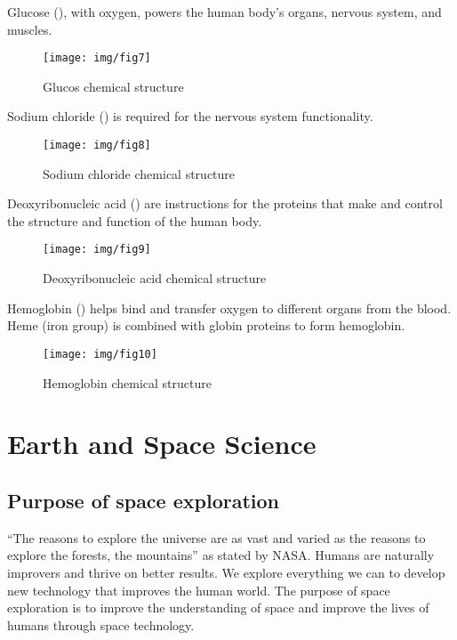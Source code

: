 \documentclass{article}
\begin{document}
Glucose (), with oxygen, powers the human body’s organs, nervous system, and muscles.
 
\begin{figure}[htbp]
    \center
    \texttt{[image: img/fig7]}
    \caption{Glucos chemical structure}
\end{figure}
 
\newpage
 
Sodium chloride () is required for the nervous system functionality. 
 
\begin{figure}[htbp]
    \center
    \texttt{[image: img/fig8]}
    \caption{Sodium chloride chemical structure}
\end{figure}
 
Deoxyribonucleic acid () are instructions for the proteins that make and control the structure and function of the human body.
 
\begin{figure}[htbp]
    \center
    \texttt{[image: img/fig9]}
    \caption{Deoxyribonucleic acid chemical structure}
\end{figure}
 
Hemoglobin () helps bind and transfer oxygen to different organs from the blood. Heme (iron group) is combined with globin proteins to form hemoglobin. 
 
\begin{figure}[htbp]
    \center
    \texttt{[image: img/fig10]}
    \caption{Hemoglobin chemical structure}
\end{figure}
 
\newpage
 
\section{Earth and Space Science}
 
\subsection{Purpose of space exploration}
“The reasons to explore the universe are as vast and varied as the reasons to explore the forests, the mountains” as stated by NASA. Humans are naturally improvers and thrive on better results. We explore everything we can to develop new technology that improves the human world. The purpose of space exploration is to improve the understanding of space and improve the lives of humans through space technology. 
 
\end{document}
